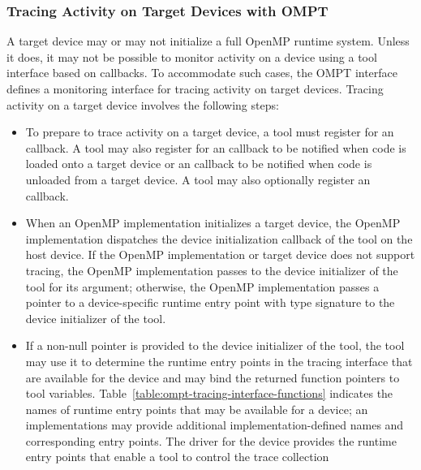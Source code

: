\subsubsection{Tracing Activity on Target Devices with OMPT}
\label{sec:tracing-device-activity}

A target device may or may not initialize a full OpenMP runtime system.
Unless it does, it may not be possible to monitor activity on a device 
using a tool interface based on callbacks. To accommodate such cases, 
the OMPT interface defines a monitoring interface for tracing activity 
on target devices. Tracing activity on a target device involves the 
following steps:

\begin{itemize}
\item To prepare to trace activity on a target device, a tool must 
      register for an  callback.  
      A tool may also register for an  
      callback to be notified when code is loaded onto a target device 
      or an  callback to be notified 
      when code is unloaded from a target device. A tool may also 
      optionally register an  callback.
\item When an OpenMP implementation initializes a target device, the
      OpenMP implementation dispatches the device initialization callback 
      of the tool on the host device. If the OpenMP implementation or target 
      device does not support tracing, the OpenMP implementation passes
       to the device initializer of the tool for its  
      argument; otherwise, the OpenMP implementation passes a pointer 
      to a device-specific runtime entry point with type signature 
       to the device initializer of the tool.
\item If a non-null  pointer is provided to the device initializer 
      of the tool, the tool may use it to determine the runtime entry points in 
      the tracing interface that are available for the device and may bind the 
      returned function pointers to tool variables. 
  Table~\ref{table:ompt-tracing-interface-functions} indicates the
      names of runtime entry points that may be available for a device; an
      implementations may provide additional implementation-defined names and 
      corresponding entry points. The driver for the device provides the
      runtime entry points that enable a tool to control the trace collection

\end{itemize}
